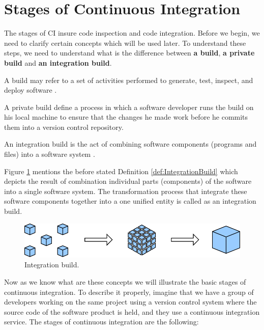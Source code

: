 \section{Stages of Continuous Integration}

The stages of CI insure code inspection and code integration. Before we begin, we need to clarify certain concepts which will be used later. To understand these steps, we need to understand what is the difference between \textbf{a build}, \textbf{a private build} and \textbf{an integration build}.

\begin{DEF}
A build may refer to a set of activities performed to generate, test, inspect, and deploy software \cite{CIbook}.
\end{DEF}

\begin{DEF}
A private build define a process in which a software developer runs the build on his local machine to ensure that the changes he made work before he commits them into a version control repository.
\end{DEF}

\begin{DEF}\label{def:IntegrationBuild}
An integration build is the act of combining software components (programs and files) into a software system \cite{CIbook}.
\end{DEF}

Figure \ref{fig:IntegrationBuild} mentions the before stated Definition \ref{def:IntegrationBuild} which depicts the result of combination individual parts (components) of the software into a single software system. The transformation process that integrate these software components together into a one unified entity is called as an integration build.

\begin{figure}[H]
    \centering
    \includegraphics[scale=1]{img/system_integration.pdf}
    \caption{Integration build.}
    \label{fig:IntegrationBuild}
\end{figure}


Now as we know what are these concepts we will illustrate the basic stages of continuous integration. To describe it properly, imagine that we have a group of developers working on the same project using a version control system where the source code of the software product is held, and they use a continuous integration service. The stages of continuous integration are the following:

